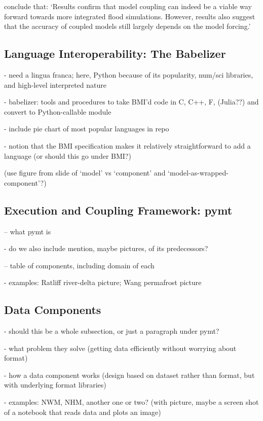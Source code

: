 \documentclass[12pt]{amsart}
\begin{document}
\citep{hoch2019evaluating} conclude
that: `Results confirm that model coupling can indeed be a viable way forward towards more integrated flood simulations. However, results also suggest that the accuracy of coupled models still largely depends on the model forcing.'

\subsection{Language Interoperability: The Babelizer}

- need a lingua franca; here, Python because of its popularity, num/sci libraries, and high-level interpreted nature

- babelizer: tools and procedures to take BMI'd code in C, C++, F, (Julia??) and convert to Python-callable module

- include pie chart of most popular languages in repo

- notion that the BMI specification makes it relatively straightforward to add a language (or should this go under BMI?)

(use figure from slide of `model' vs `component' and `model-as-wrapped-component'?)

\subsection{Execution and Coupling Framework: pymt}

-- what pymt is

- do we also include mention, maybe pictures, of its predecessors?

-- table of components, including domain of each

- examples: Ratliff river-delta picture; Wang permafrost picture

\subsection{Data Components}

- should this be a whole subsection, or just a paragraph under pymt?

- what problem they solve (getting data efficiently without worrying about format)

- how a data component works (design based on dataset rather than format, but with underlying format libraries)

- examples: NWM, NHM, another one or two? (with picture, maybe a screen shot of a notebook that reads data and plots an image)
\end{document}
